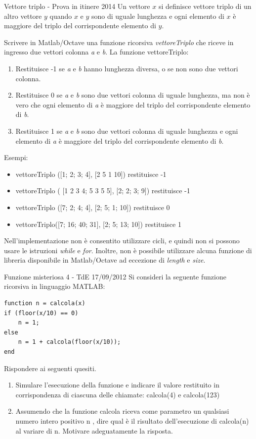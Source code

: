 \documentclass[format=169,]{beamer}
\begin{document}
\begin{frame}[allowframebreaks]{Vettore triplo - Prova in itinere 2014}
Un vettore $x$ si definisce vettore triplo di un altro vettore $y$ quando $x$ e
$y$ sono di uguale lunghezza e ogni elemento di $x$ è maggiore del triplo
del corrispondente elemento di $y$.

Scrivere in Matlab/Octave una funzione \alert{ricorsiva} \emph{vettoreTriplo} che
riceve in ingresso due vettori \alert{colonna} \emph{a} e \emph{b}. La funzione
vettoreTriplo:
\begin{enumerate}
	\item Restituisce -1 se \emph{a} e \emph{b} hanno lunghezza diversa, o se non sono due vettori colonna.
	\item Restituisce 0 se \emph{a} e \emph{b} sono due vettori colonna di uguale
	lunghezza, ma non è vero che ogni elemento di \emph{a} è maggiore
	del triplo del corrispondente elemento di \emph{b}.
	\item Restituisce 1 se \emph{a} e \emph{b} sono due vettori colonna di uguale
	lunghezza e ogni elemento di \emph{a} è maggiore
	del triplo del corrispondente elemento di \emph{b}.
\end{enumerate}

Esempi:
\begin{itemize}
	\item vettoreTriplo ([1; 2; 3; 4], [2 5 1 10]) restituisce -1
	\item vettoreTriplo ( [1 2 3 4; 5 3 5 5], [2; 2; 3; 9]) restituisce -1
	\item vettoreTriplo ([7; 2; 4; 4], [2; 5; 1; 10]) restituisce 0
	\item vettoreTriplo([7; 16; 40; 31], [2; 5; 13; 10]) restituisce 1
\end{itemize}

Nell’implementazione \alert{non} è consentito utilizzare cicli, e quindi \alert{non} si possono usare le istruzioni \emph{while} e \emph{for}. Inoltre, \alert{non} è possibile utilizzare alcuna funzione di libreria disponibile in Matlab/Octave ad eccezione di \emph{length} e \emph{size}.
\end{frame}


\begin{frame}{Funzione misteriosa 4 - TdE 17/09/2012}
Si consideri la seguente funzione ricorsiva in linguaggio MATLAB:
\begin{lstlisting}[style=matlab=]
function n = calcola(x)
if (floor(x/10) == 0)
    n = 1;
else
    n = 1 + calcola(floor(x/10));
end
\end{lstlisting}

Rispondere ai seguenti quesiti.
\begin{enumerate}
	\item Simulare l'esecuzione della funzione e indicare il valore restituito in corrispondenza di ciascuna delle
	chiamate: calcola(4) e calcola(123)
	\item 
	Assumendo che la funzione calcola riceva come parametro un qualsiasi numero intero positivo n , dire qual
	è il risultato dell'esecuzione di calcola(n) al variare di n. Motivare adeguatamente la risposta.
\end{enumerate}
\end{frame}
\end{document}
